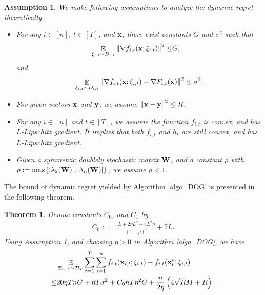 \documentclass{article}
\newtheorem{Theorem}{\bf{Theorem}}
\newtheorem{Assumption}{\bf{Assumption}}
\begin{document}
\begin{Assumption}
\label{assumption_bounded_gradient_domain}
We make following assumptions to analyze the dynamic regret theoretically.
\begin{itemize}
\item For any $i\in[n]$, $t\in[T]$, and ${\bf x}$, there exist constants $G$ and $\sigma^2$ such that
\begin{align}
\nonumber
\mathop{\mathbb{E}}_{ \xi_{i,t} \sim D_{i,t} }\left\lVert\nabla f_{i,t}({\bf x};\xi_{i,t})\right\rVert^2 \le &  G,
\end{align} and 
\begin{align}
\nonumber
\mathop{\mathbb{E}}_{ \xi_{i,t} \sim D_{i,t} } \left\lVert\nabla f_{i,t}({\bf x}; \xi_{i,t}) - \nabla F_{i,t}({\bf x})\right\rVert^2 \le \sigma^2.
\end{align}
\item For given vectors ${\bf x}$ and ${\bf y}$, we assume $\left\lVert{\bf x}-{\bf y}\right\rVert^2 \le R$.
\item  For any $i\in[n]$ and $t\in[T]$, we assume the function $f_{i,t}$ is convex, and has $L$-Lipschitz gradient. It implies that both $f_{i,t}$ and $h_t$ are still convex, and has $L$-Lipschitz gradient.
\item Given a symmetric doublely stochastic matrix ${\bf W}$, and a constant $\rho$ with $\rho := \max\{ |\lambda_2({\bf W})|, |\lambda_n({\bf W})| \}$, we assume $\rho <1$.
\end{itemize}
\end{Assumption}




The bound of dynamic regret yielded by Algorithm \ref{algo_DOG} is presented in the following theorem. 
\begin{Theorem}
\label{theorem_regret_upper_bound}
Denote constants $C_0$, and $C_1$ by
\begin{align}
\nonumber
C_0 := & \frac{L + 2\eta L^2  + 4L^2 \eta}{(1-\rho)^2} +2L.
\end{align} Using Assumption \ref{assumption_bounded_gradient_domain}, and choosing $\eta>0$ in Algorithm \ref{algo_DOG}, we have
\begin{align}
\nonumber
& \mathop{\mathbb{E}}_{ \Xi_{n,T} \sim \mathcal{D}_{T} } \sum_{t=1}^T\sum_{i=1}^n f_{i,t}({\bf x}_{i,t};\xi_{i,t}) - f_{i,t}({\bf x}_t^\ast;\xi_{i,t}) \\ \nonumber
\le & 20\eta T n G +  \eta T\sigma^2 + C_0 nT\eta^2 G    + \frac{n}{2\eta}\left(  4\sqrt{R}M + R   \right).
\end{align}

\end{Theorem}
\end{document}
